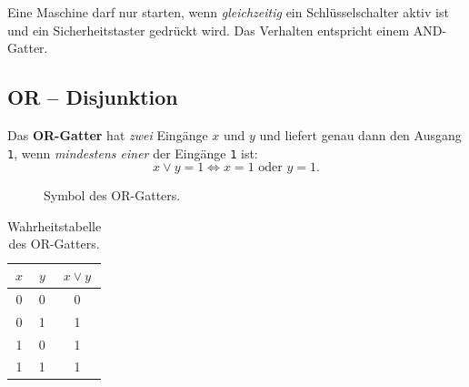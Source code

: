 \begin{myexample}
    Eine Maschine darf nur starten, wenn \emph{gleichzeitig} ein Schlüsselschalter aktiv ist und ein Sicherheitstaster gedrückt wird. Das Verhalten entspricht einem AND-Gatter.
\end{myexample}

\subsection{OR -- Disjunktion}

\begin{mydefinition}[OR-Gatter]
    Das \textbf{OR-Gatter} hat \emph{zwei} Eingänge $x$ und $y$ und liefert genau dann den Ausgang \texttt{1}, wenn \emph{mindestens einer} der Eingänge \texttt{1} ist:
    \[
        x \vee y = 1 \iff x = 1 \text{ oder } y = 1.
    \]
\end{mydefinition}

\begin{figure}[H]
    \centering
    \caption{Symbol des OR-Gatters.}
    \label{fig:or_gatter}
\end{figure}

\begin{table}[H]
    \centering
    \begin{tabular}{c|c||c}
        $x$ & $y$ & $x \vee y$ \\\midrule\midrule
        0 & 0 & 0 \\\midrule
        0 & 1 & 1 \\\midrule
        1 & 0 & 1 \\\midrule
        1 & 1 & 1 \\
    \end{tabular}
    \caption{Wahrheitstabelle des OR-Gatters.}
    \label{tab:or}
\end{table}

